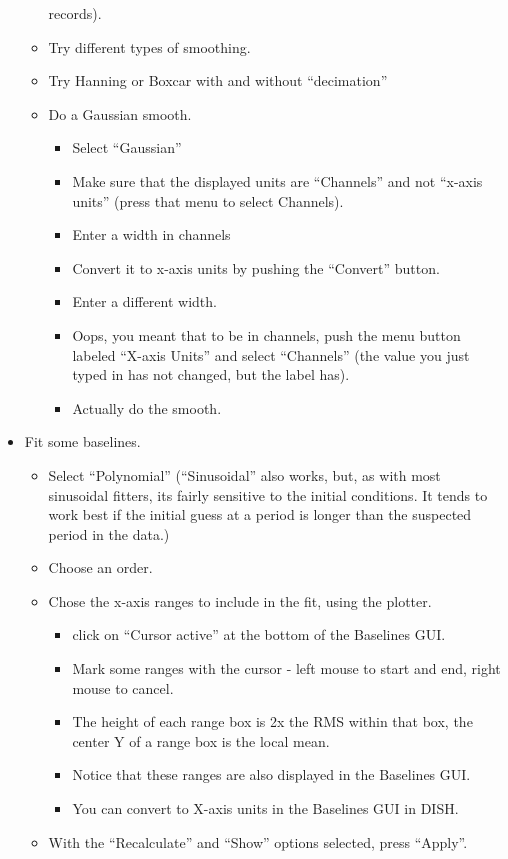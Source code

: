 \begin{itemize}
\begin{itemize}
records).
\item Try different types of smoothing.
\item Try Hanning or Boxcar with and without ``decimation''
\item Do a Gaussian smooth.
\begin{itemize}
\item Select ``Gaussian''
\item Make sure that the displayed units are ``Channels'' and not
``x-axis units'' (press that menu to select Channels).
\item Enter a width in channels
\item Convert it to x-axis units by pushing the ``Convert'' button.
\item Enter a different width.
\item Oops, you meant that to be in channels, push the menu button
labeled ``X-axis Units'' and select ``Channels'' (the value you just
typed in has not changed, but the label has).
\item Actually do the smooth.
\end{itemize}
\end{itemize}
\item Fit some baselines.
\begin{itemize}
\item Select ``Polynomial'' 
(``Sinusoidal'' also works, but, as with most sinusoidal fitters, its
fairly sensitive to the initial conditions.  It tends to work best if
the initial guess at a period is longer than the suspected period in the data.)
\item Choose an order.
\item Chose the x-axis ranges to include in the fit, using the plotter.
\begin{itemize}
\item click on ``Cursor active'' at the bottom of the Baselines GUI.
\item Mark some ranges with the cursor - left mouse to start and end, right
mouse to cancel.
\item The height of each range box is 2x the RMS within that box, the 
center Y of a range box is the local mean.
\item Notice that these ranges are also displayed in the Baselines GUI.
\item You can convert to X-axis units in the Baselines GUI in DISH.
\end{itemize}
\item With the ``Recalculate'' and ``Show'' options selected, press ``Apply''.

\end{itemize}
\end{itemize}

